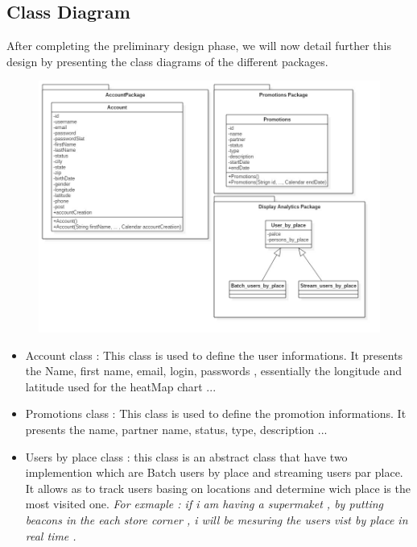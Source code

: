 \subsection{ Class Diagram }
After completing the preliminary design phase, 
we will now detail further this design by presenting the class diagrams of the different packages.
\begin{figure}[h!]
	\centering
	\includegraphics[height=0.4\textheight]{fig01/ClassDiagram}
	\label{fig:FilialesEtClients}
\end{figure}

 \begin{itemize}
	\item Account class : This class is used to define the user informations. 
	It presents the Name, first name, email, login, passwords , essentially the longitude and latitude used for the
	heatMap chart ...
	\item Promotions class : This class is used to define the promotion informations. 
	It presents the name, partner name, status, type, description ... 
	\item Users by place class : this class is an abstract class that have two implemention which are Batch users by place and streaming
	users par place. It allows as to track users basing on locations and determine wich place is the most visited one.
	\textit{For exmaple : if i am having a supermaket , by putting beacons in the each store corner , i will be mesuring the users
	vist by place in real time .}
\end{itemize}

